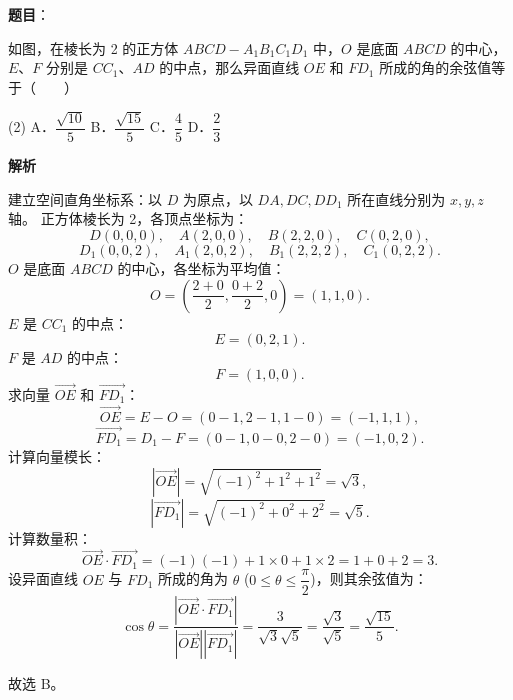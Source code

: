 \begin{answer}

\textbf{题目}：

如图，在棱长为 2 的正方体 $ABCD - A_1B_1C_1D_1$ 中，$O$ 是底面 $ABCD$ 的中心，$E$、$F$ 分别是 $CC_1$、$AD$ 的中点，那么异面直线 $OE$ 和 $FD_1$ 所成的角的余弦值等于\mbox{（　　）}
\nopagebreak[4]
\begin{center}\end{center}
\nopagebreak[4]
\begin{gkopts}(2)
\task A．$\dfrac{\sqrt{10}}{5}$
\task B．$\dfrac{\sqrt{15}}{5}$
\task C．$\dfrac{4}{5}$
\task D．$\dfrac{2}{3}$
\end{gkopts}

\textbf{解析}
\nopagebreak[4]
\begin{center}\end{center}
\nopagebreak[4]
建立空间直角坐标系：以 $D$ 为原点，以 $DA, DC, DD_1$ 所在直线分别为 $x, y, z$ 轴。
正方体棱长为 2，各顶点坐标为：
\nopagebreak[4]
\[
D(0, 0, 0), \quad A(2, 0, 0), \quad B(2, 2, 0), \quad C(0, 2, 0),
\]
\nopagebreak[4]
\[
D_1(0, 0, 2), \quad A_1(2, 0, 2), \quad B_1(2, 2, 2), \quad C_1(0, 2, 2).
\]
$O$ 是底面 $ABCD$ 的中心，各坐标为平均值：
\nopagebreak[4]
\[
O = \left(\dfrac{2+0}{2}, \dfrac{0+2}{2}, 0\right) = (1, 1, 0).
\]
$E$ 是 $CC_1$ 的中点：
\nopagebreak[4]
\[
E = (0, 2, 1).
\]
$F$ 是 $AD$ 的中点：
\nopagebreak[4]
\[
F = (1, 0, 0).
\]
求向量 $\vec{OE}$ 和 $\vec{FD_1}$：
\nopagebreak[4]
\[
\vec{OE} = E - O = (0 - 1, 2 - 1, 1 - 0) = (-1, 1, 1),
\]
\nopagebreak[4]
\[
\vec{FD_1} = D_1 - F = (0 - 1, 0 - 0, 2 - 0) = (-1, 0, 2).
\]
计算向量模长：
\nopagebreak[4]
\[
|\vec{OE}| = \sqrt{(-1)^2 + 1^2 + 1^2} = \sqrt{3},
\]
\nopagebreak[4]
\[
|\vec{FD_1}| = \sqrt{(-1)^2 + 0^2 + 2^2} = \sqrt{5}.
\]
计算数量积：
\nopagebreak[4]
\[
\vec{OE} \cdot \vec{FD_1} = (-1)(-1) + 1 \times 0 + 1 \times 2 = 1 + 0 + 2 = 3.
\]
设异面直线 $OE$ 与 $FD_1$ 所成的角为 $\theta$ ($0 \le \theta \le \dfrac{\pi}{2}$)，则其余弦值为：
\nopagebreak[4]
\[
\cos\theta = \dfrac{|\vec{OE} \cdot \vec{FD_1}|}{|\vec{OE}||\vec{FD_1}|} = \dfrac{3}{\sqrt{3}\sqrt{5}} = \dfrac{\sqrt{3}}{\sqrt{5}} = \dfrac{\sqrt{15}}{5}.
\]

故选 B。


\end{answer}
